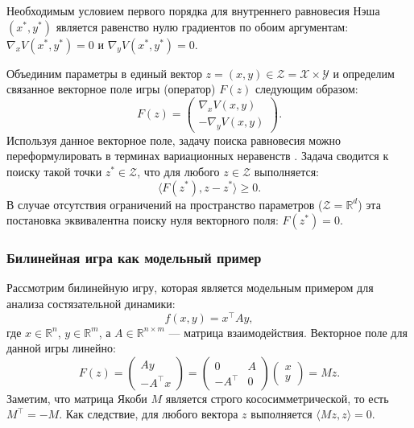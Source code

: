 \documentclass[12pt,a4paper]{article}
\begin{document}
	Необходимым условием первого порядка для внутреннего равновесия Нэша $(x^*, y^*)$ является равенство нулю градиентов по обоим аргументам: $\nabla_x V(x^*, y^*) = 0$ и $\nabla_y V(x^*, y^*) = 0$. 
	
	Объединим параметры в единый вектор $z = (x, y) \in \mathcal{Z} = \mathcal{X} \times \mathcal{Y}$ и определим связанное векторное поле игры (оператор) $F(z)$ следующим образом:
	\begin{equation}
		F(z) = \begin{pmatrix}
			\nabla_x V(x, y) \\
			-\nabla_y V(x, y)
		\end{pmatrix}.
	\end{equation}
	Используя данное векторное поле, задачу поиска равновесия можно переформулировать в терминах вариационных неравенств . Задача сводится к поиску такой точки $z^* \in \mathcal{Z}$, что для любого $z \in \mathcal{Z}$ выполняется:
	\begin{equation}
		\langle F(z^*), z - z^* \rangle \ge 0.
	\end{equation}
	В случае отсутствия ограничений на пространство параметров ($\mathcal{Z} = \mathbb{R}^d$) эта постановка эквивалентна поиску нуля векторного поля: $F(z^*) = 0$.
	
	\subsubsection{Билинейная игра как модельный пример}
	Рассмотрим билинейную игру, которая является  модельным примером для анализа состязательной динамики:
	\begin{equation}
		f(x, y) = x^\top A y,
	\end{equation}
	где $x \in \mathbb{R}^n$, $y \in \mathbb{R}^m$, а $A \in \mathbb{R}^{n \times m}$ --- матрица взаимодействия. Векторное поле для данной игры линейно:
	\begin{equation}
		F(z) = \begin{pmatrix} A y \\ -A^\top x \end{pmatrix} = \begin{pmatrix} 0 & A \\ -A^\top & 0 \end{pmatrix} \begin{pmatrix} x \\ y \end{pmatrix} = Mz.
	\end{equation}
	Заметим, что матрица Якоби $M$ является строго кососимметрической, то есть $M^\top = -M$. Как следствие, для любого вектора $z$ выполняется $\langle Mz, z \rangle = 0$.
	
\end{document}

